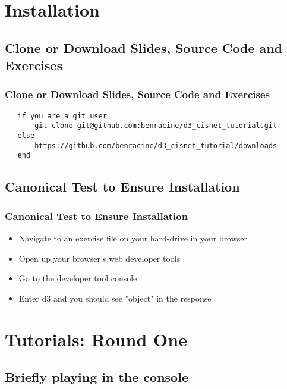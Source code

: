 \documentclass{beamer}
\begin{document}
\section{Installation}

\subsection{Clone or Download Slides, Source Code and Exercises}

\begin{frame}[fragile]
    \frametitle{Clone or Download Slides, Source Code and Exercises}
        \tiny{
        \begin{verbatim}
   if you are a git user
       git clone git@github.com:benracine/d3_cisnet_tutorial.git
   else
       https://github.com/benracine/d3_cisnet_tutorial/downloads
   end
        \end{verbatim}
        }
\end{frame}



\subsection{Canonical Test to Ensure Installation}

\begin{frame}
    \frametitle{Canonical Test to Ensure Installation}
    \begin{itemize}
\pause
    \item Navigate to an exercise file on your hard-drive in your browser
\pause
    \item Open up your browser's web developer tools
\pause
    \item Go to the developer tool console
\pause
    \item Enter d3 and you should see "object" in the response
\pause
    \end{itemize}
\end{frame}



\section{Tutorials: Round One}

\subsection{Briefly playing in the console}
\end{document}
